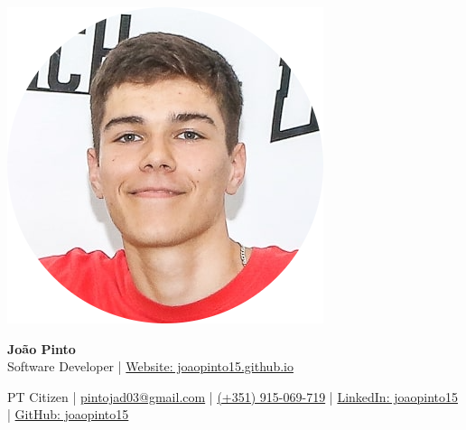 \documentclass[10pt, letterpaper]{article}
\newenvironment{header}{
    \setlength{\topsep}{0pt}\par\kern\topsep\centering\linespread{1}
}{
    \par\kern\topsep
}
\begin{document}
\begin{header}
    \begin{minipage}[c]{0.2\textwidth} %
        \includegraphics[width=\textwidth]{photo.jpg} %
    \end{minipage}
    \hfill
\begin{minipage}[c]{0.75\textwidth} %
    {\fontsize{25 pt}{25 pt}\selectfont \textbf{João Pinto}} \\[0.1cm] %
    {\fontsize{12 pt}{12 pt}\selectfont Software Developer | \href{https://joaopinto15.github.io}{Website: joaopinto15.github.io}}
\end{minipage}

    
    \vspace{0.8cm} %
    \centering
    \normalsize
    PT Citizen | 
    \href{mailto:pintojad03@gmail.com}{pintojad03@gmail.com} | 
    \href{tel:+351-915-069-719}{(+351) 915-069-719} | 
    \href{https://linkedin.com/in/joaopinto15}{LinkedIn: joaopinto15} | 
    \href{https://github.com/joaopinto15}{GitHub: joaopinto15}
\end{header}
\end{document}
